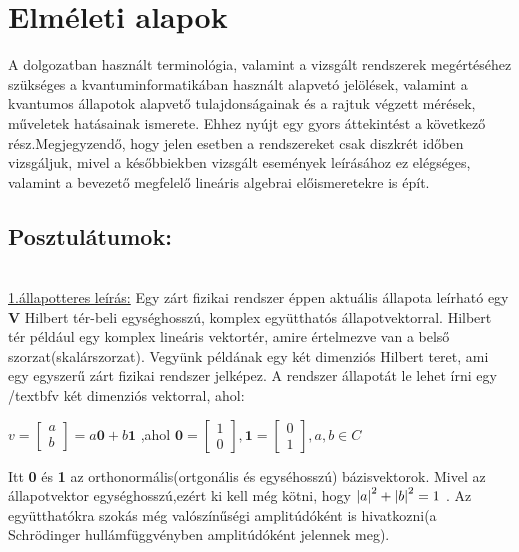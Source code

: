 





\section{Elméleti alapok}

A dolgozatban használt terminológia, valamint a vizsgált rendszerek megértéséhez szükséges a kvantuminformatikában használt alapvetó jelölések, valamint a kvantumos állapotok alapvető tulajdonságainak és a rajtuk végzett mérések, műveletek hatásainak ismerete. Ehhez nyújt egy gyors áttekintést a következő rész.Megjegyzendő, hogy jelen esetben a rendszereket csak diszkrét időben vizsgáljuk, mivel a későbbiekben vizsgált események leírásához ez elégséges, valamint a bevezető megfelelő lineáris algebrai előismeretekre is épít.

\subsection{Posztulátumok:} 
 \cite{kvantkonyv1}\\

\underline{1.állapotteres leírás:} Egy zárt fizikai rendszer éppen aktuális állapota leírható egy \textbf{V} Hilbert tér-beli egységhosszú, komplex együtthatós állapotvektorral. Hilbert tér például egy komplex lineáris vektortér, amire értelmezve van a belső szorzat(skalárszorzat). 
Vegyünk példának egy két dimenziós Hilbert teret, ami egy egyszerű zárt fizikai rendszer jelképez. A rendszer állapotát le lehet írni egy /textbf{v} két dimenziós vektorral, ahol:\\
\begin{center}
$ v= \begin{bmatrix} a\\b \end{bmatrix} = a\textbf{0}+ b\textbf{1} $ ,ahol 
$\textbf{0}=\begin{bmatrix} 1\\0 \end{bmatrix} , \textbf{1}=\begin{bmatrix} 0\\1 \end{bmatrix} ,   a,b \in C$
\end{center}
Itt \textbf{0} és \textbf{1} az orthonormális(ortgonális és egyséhosszú) bázisvektorok. Mivel az állapotvektor egységhosszú,ezért ki kell még kötni, hogy 
$\abs{a}^2+\abs{b}^2 =1$ . Az együtthatókra szokás még valószínűségi amplitúdóként is hivatkozni(a Schrödinger hullámfüggvényben amplitúdóként jelennek meg).

